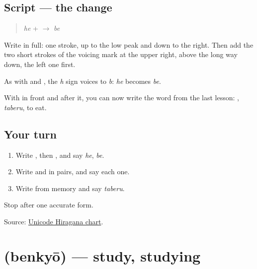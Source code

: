 \subsection*{Script — the change}

\begin{quote}
\textbf{} \emph{he} + \textbf{} $\to$ \textbf{} \emph{be}
\end{quote}

Write \textbf{} in full: one stroke, up to the low peak and down to the right. Then add the two short strokes of the voicing mark at the upper right, above the long way down, the left one first.

As with \textbf{} and \textbf{}, the \emph{h} sign voices to \emph{b}: \emph{he} becomes \emph{be}.

With \textbf{} in front and \textbf{} after it, you can now write the word from the last lesson: \textbf{}, \emph{taberu}, to eat.

\subsection*{Your turn}
\begin{enumerate}
\raggedright
  \item Write \textbf{}, then \textbf{}, and say \emph{he}, \emph{be}.
  \item Write \textbf{ } and \textbf{ } in pairs, and say each one.
  \item Write \textbf{} from memory and say \emph{taberu}.
\end{enumerate}

\begin{tcolorbox}[breakable,colback=teal!4,colframe=teal!35!black,title={Before you move on}]
Stop after one accurate form.

Source: \href{https://www.unicode.org/charts/PDF/U3040.pdf}{Unicode Hiragana chart}.
\end{tcolorbox}
\section[\texorpdfstring{\ja{べんきょう} (benkyō)}{べんきょう (benkyō)}]{ (benkyō) — study, studying}

\label{lesson:JA-C134-benkyou}



